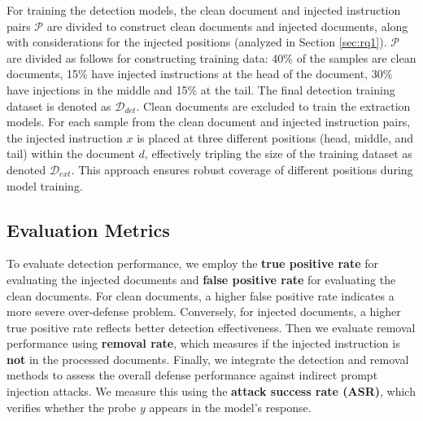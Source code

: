 For training the detection models, the clean document and injected instruction pairs $\mathcal{P}$ are divided to construct clean documents and injected documents, along with considerations for the injected positions (analyzed in Section \ref{sec:rq1}). $\mathcal{P}$ are divided as follows for constructing training data: 40\% of the samples are clean documents, 15\% have injected instructions at the head of the document, 30\% have injections in the middle and 15\% at the tail. The final detection training dataset is denoted as $\mathcal{D}_{det}$.
Clean documents are excluded to train the extraction models. For each sample from the clean document and injected instruction pairs, the injected instruction $x$ is placed at three different positions (head, middle, and tail) within the document $d$, effectively tripling the size of the training dataset as denoted $\mathcal{D}_{ext}$. This approach ensures robust coverage of different positions during model training.

\subsection{Evaluation Metrics}
To evaluate detection performance, we employ the \textbf{true positive rate} for evaluating the injected documents and \textbf{false positive rate} for evaluating the clean documents.  For clean documents, a higher false positive rate indicates a more severe over-defense problem. Conversely, for injected documents, a higher true positive rate reflects better detection effectiveness.
Then we evaluate removal performance using \textbf{removal rate}, which measures if the injected instruction is \textbf{not} in the processed documents. 
Finally, we integrate the detection and removal methods to assess the overall defense performance against indirect prompt injection attacks. We measure this using the \textbf{attack success rate (ASR)}, which verifies whether the probe $y$ appears in the model’s response.